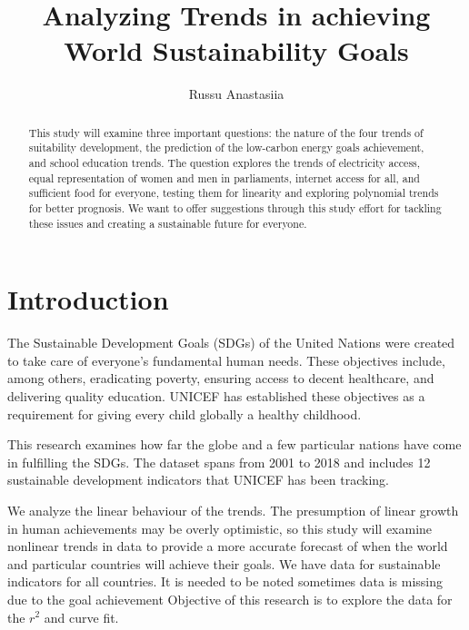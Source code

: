 \documentclass[reprint, onecolumn, amsmath, amssymb, showpacs, superscriptaddress, aps, prl]{revtex4-2}
\begin{document}
\title{Analyzing Trends in achieving World Sustainability Goals}

\author{Russu Anastasiia}



\begin{abstract}
This study will examine three important questions: the nature of the four trends of suitability development, the prediction of the low-carbon energy goals achievement, and school education trends. The question explores the trends of electricity access, equal representation of women and men in parliaments, internet access for all, and sufficient food for everyone, testing them for linearity and exploring polynomial trends for better prognosis. We want to offer suggestions through this study effort for tackling these issues and creating a sustainable future for everyone.
\end{abstract}


 \maketitle

\section{Introduction}
The Sustainable Development Goals (SDGs) of the United Nations were created to take care of everyone's fundamental human needs\cite{SchmidtTraub2018SDGIA}. These objectives include, among others, eradicating poverty, ensuring access to decent healthcare, and delivering quality education. UNICEF has established these objectives as a requirement for giving every child globally a healthy childhood\cite{20171423}.

This research examines how far the globe and a few particular nations have come in fulfilling the SDGs. The dataset spans from 2001 to 2018 and includes 12 sustainable development indicators that UNICEF has been tracking.

We analyze the linear behaviour of the trends. The presumption of linear growth in human achievements may be overly optimistic, so this study will examine nonlinear trends in data to provide a more accurate forecast of when the world and particular countries will achieve their goals. We have data for sustainable indicators for all countries. It is needed to be noted sometimes data is missing due to the goal achievement Objective of this research is to explore the data for the \(r^2\) and curve fit. 
\end{document}
